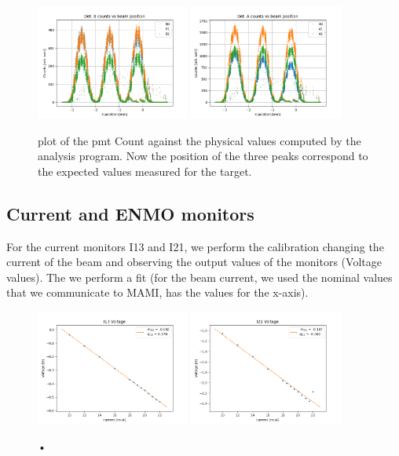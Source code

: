 \begin{figure}[hbtp]
\centering
\includegraphics[width=0.45\textwidth]{Analysis/XcheckB.png} 
\includegraphics[width=0.45\textwidth]{Analysis/XcheckA.png}
\caption{plot of the pmt Count against the physical values computed by the analysis program. Now the position of the three peaks correspond to the expected values measured for the target.}
\label{fig:CheckHori}
\end{figure}


\subsection{Current and ENMO monitors}

For the current monitors I13 and I21, we perform the calibration changing the current of the beam and observing the output values of the monitors (Voltage values). The we perform a fit (for the beam current, we used the nominal values that we communicate to MAMI, has the values for the x-axis).

\begin{figure}[hbtp]
\centering
\includegraphics[width = 0.45\textwidth]{Analysis/I13_Calibration.png}
\includegraphics[width = 0.45\textwidth]{Analysis/I21_Calibration.png} 
\caption{•}
\end{figure}

